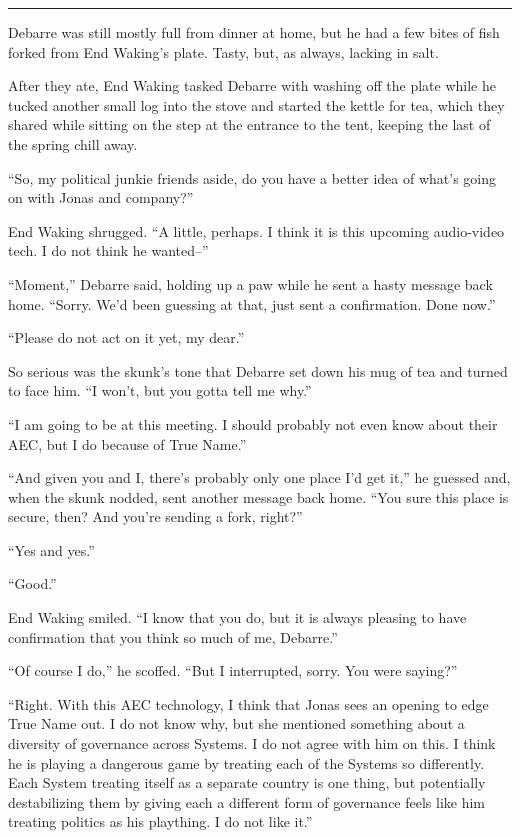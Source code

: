 \begin{center}\rule{0.5\linewidth}{0.5pt}\end{center}

Debarre was still mostly full from dinner at home, but he had a few bites of fish forked from End Waking's plate. Tasty, but, as always, lacking in salt.

After they ate, End Waking tasked Debarre with washing off the plate while he tucked another small log into the stove and started the kettle for tea, which they shared while sitting on the step at the entrance to the tent, keeping the last of the spring chill away.

``So, my political junkie friends aside, do you have a better idea of what's going on with Jonas and company?''

End Waking shrugged. ``A little, perhaps. I think it is this upcoming audio-video tech. I do not think he wanted--''

``Moment,'' Debarre said, holding up a paw while he sent a hasty message back home. ``Sorry. We'd been guessing at that, just sent a confirmation. Done now.''

``Please do not act on it yet, my dear.''

So serious was the skunk's tone that Debarre set down his mug of tea and turned to face him. ``I won't, but you gotta tell me why.''

``I am going to be at this meeting. I should probably not even know about their AEC, but I do because of True Name.''

``And given you and I, there's probably only one place I'd get it,'' he guessed and, when the skunk nodded, sent another message back home. ``You sure this place is secure, then? And you're sending a fork, right?''

``Yes and yes.''

``Good.''

End Waking smiled. ``I know that you do, but it is always pleasing to have confirmation that you think so much of me, Debarre.''

``Of course I do,'' he scoffed. ``But I interrupted, sorry. You were saying?''

``Right. With this AEC technology, I think that Jonas sees an opening to edge True Name out. I do not know why, but she mentioned something about a diversity of governance across Systems. I do not agree with him on this. I think he is playing a dangerous game by treating each of the Systems so differently. Each System treating itself as a separate country is one thing, but potentially destabilizing them by giving each a different form of governance feels like him treating politics as his plaything. I do not like it.''

